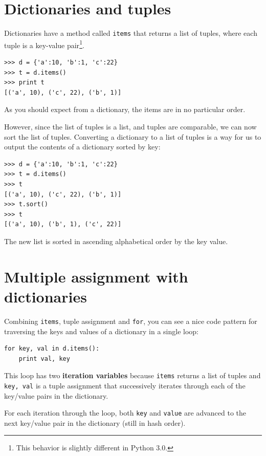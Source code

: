 \documentclass[10pt]{book}
\begin{document}
\section{Dictionaries and tuples}


Dictionaries have a method called {\tt items} that returns a list of
tuples, where each tuple is a key-value 
pair\footnote{This behavior is slightly different in Python 3.0.}.

\beforeverb
\begin{verbatim}
>>> d = {'a':10, 'b':1, 'c':22}
>>> t = d.items()
>>> print t
[('a', 10), ('c', 22), ('b', 1)]
\end{verbatim}
\afterverb
%
As you should expect from a dictionary, the items are in no
particular order.

However, since the list of tuples is a list, and tuples are comparable,
we can now sort the list of tuples.  Converting a dictionary
to a list of tuples is a way for us to output the contents of a 
dictionary sorted by key:

\beforeverb
\begin{verbatim}
>>> d = {'a':10, 'b':1, 'c':22}
>>> t = d.items()
>>> t
[('a', 10), ('c', 22), ('b', 1)]
>>> t.sort()
>>> t
[('a', 10), ('b', 1), ('c', 22)]
\end{verbatim}
\afterverb
%
The new list is sorted in ascending alphabetical order by the key value.

\section{Multiple assignment with dictionaries}


Combining {\tt items}, tuple assignment and {\tt for}, you
can see a nice code pattern for traversing the keys and values of a dictionary
in a single loop:

\beforeverb
\begin{verbatim}
for key, val in d.items():
    print val, key
\end{verbatim}
\afterverb
%
This loop has two {\bf iteration variables} because {\tt items} returns
a list of tuples and {\tt key, val} is a tuple assignment
that successively iterates through each of the key/value pairs in the dictionary.  

For each iteration
through the loop, both {\tt key} and {\tt value} are advanced to the
next key/value pair in the dictionary (still in hash order).
\end{document}
